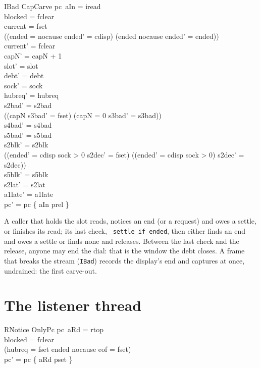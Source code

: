 \documentclass[a4paper,10pt,fleqn]{article}
\begin{document}
\begin{schema}{IBad}
  CapCarve
\where
  pc~aIn = iread \\
  blocked = fclear \\
  current = fset \\
  ((ended = nocause \land ended' = cdisp) \lor (ended \neq nocause \land ended' = ended)) \\
  current' = fclear \\
  capN' = capN + 1 \\
  slot' = slot \\
  debt' = debt \\
  sock' = sock \\
  hubreq' = hubreq \\
  s2bad' = s2bad \\
  ((capN  \land s3bad' = fset) \lor (capN = 0 \land s3bad' = s3bad)) \\
  s4bad' = s4bad \\
  s5bad' = s5bad \\
  s2blk' = s2blk \\
  ((ended' = cdisp \land sock > 0 \land s2dec' = fset) \lor
    (\lnot (ended' = cdisp \land sock > 0) \land s2dec' = s2dec)) \\
  s5blk' = s5blk \\
  s2lat' = s2lat \\
  a1late' = a1late \\
  pc' = pc \oplus \{ aIn \mapsto prel \}
\end{schema}

A caller that holds the slot reads, notices an end (or a request) and owes a
settle, or finishes its read; its last check, \texttt{\_settle\_if\_ended}, then
either finds an end and owes a settle or finds none and releases.  Between the
last check and the release, anyone may end the dial: that is the window the
debt closes.  A frame that breaks the stream (\texttt{IBad}) records the
display's end and captures at once, undrained: the first carve-out.

\section{The listener thread}

\begin{schema}{RNotice}
  OnlyPc
\where
  pc~aRd = rtop \\
  blocked = fclear \\
  (hubreq = fset \lor ended \neq nocause \lor eof = fset) \\
  pc' = pc \oplus \{ aRd \mapsto pset \}
\end{schema}
\end{document}
